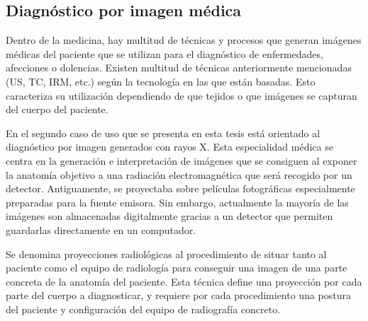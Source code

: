 \subsection{Diagnóstico por imagen médica}
\label{art:xraysim}

Dentro de la medicina, hay multitud de técnicas y procesos que generan imágenes médicas del paciente que se utilizan para el diagnóstico de enfermedades, afecciones o dolencias. Existen multitud de técnicas anteriormente mencionadas (\ac{US}, \ac{TC}, \ac{IRM}, etc.) según la tecnología en las que están basadas. Esto caracteriza su utilización dependiendo de que tejidos o que imágenes se capturan del cuerpo del paciente. 

En el segundo caso de uso que se presenta en esta tesis está orientado al diagnóstico por imagen generados con rayos X. Esta especialidad médica se centra en la generación e interpretación de imágenes que se consiguen al exponer la anatomía objetivo a una radiación electromagnética que será recogido por un detector. Antiguamente, se proyectaba sobre películas fotográficas especialmente preparadas para la fuente emisora. Sin embargo, actualmente la mayoría de las imágenes son almacenadas digitalmente gracias a un detector que permiten guardarlas directamente en un computador.

Se denomina proyecciones radiológicas al procedimiento de situar tanto al paciente como el equipo de radiología para conseguir una imagen de una parte concreta de la anatomía del paciente. Esta técnica define una proyección por cada parte del cuerpo a diagnosticar, y requiere por cada procedimiento una postura del paciente y configuración del equipo de radiografía concreto.

